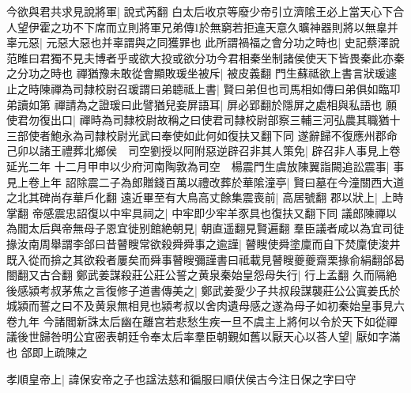 今欲與君共求見說將軍|{
	說式芮翻}
白太后收京等廢少帝引立濟隂王必上當天心下合人望伊霍之功不下席而立則將軍兄弟傳於無窮若拒違天意久曠神器則將以無辠并辜元惡|{
	元惡大惡也并辜謂與之同獲罪也}
此所謂禍福之會分功之時也|{
	史記蔡澤說范睢曰君獨不見夫博者乎或欲大投或欲分功今君相秦坐制諸侯使天下皆畏秦此亦秦之分功之時也}
禪猶豫未敢從會顯敗瑗坐被斥|{
	被皮義翻}
門生蘇祗欲上書言狀瑗遽止之時陳禪為司隸校尉召瑗謂曰弟聼祗上書|{
	賢曰弟但也司馬相如傳曰弟俱如臨卭弟讀如第}
禪請為之證瑗曰此譬猶兒妾屏語耳|{
	屏必郢翻於隱屏之處相與私語也}
願使君勿復出口|{
	禪時為司隸校尉故稱之曰使君司隸校尉部察三輔三河弘農其職猶十三部使者鮑永為司隸校尉光武曰奉使如此何如復扶又翻下同}
遂辭歸不復應州郡命　己卯以諸王禮葬北鄉侯　司空劉授以阿附惡逆辟召非其人策免|{
	辟召非人事見上卷延光二年}
十二月甲申以少府河南陶敦為司空　楊震門生虞放陳翼詣闕追訟震事|{
	事見上卷上年}
詔除震二子為郎贈錢百萬以禮改葬於華隂潼亭|{
	賢曰墓在今潼關西大道之北其碑尚存華戶化翻}
遠近畢至有大鳥高丈餘集震喪前|{
	高居號翻}
郡以狀上|{
	上時掌翻}
帝感震忠詔復以中牢具祠之|{
	中牢即少牢羊豕具也復扶又翻下同}
議郎陳禪以為閻太后與帝無母子恩宜徙别館絶朝見|{
	朝直遥翻見賢遍翻}
羣臣議者咸以為宜司徒掾汝南周舉謂李郃曰昔瞽瞍常欲殺舜舜事之逾謹|{
	瞽瞍使舜塗廩而自下焚廩使浚井既入從而揜之其欲殺者屢矣而舜事瞽瞍彌謹書曰祗載見瞽瞍夔夔齋栗掾俞絹翻郃曷閤翻又古合翻}
鄭武姜謀殺莊公莊公誓之黄泉秦始皇怨母失行|{
	行上孟翻}
久而隔絶後感潁考叔茅焦之言復修子道書傳美之|{
	鄭武姜愛少子共叔段謀襲莊公公寘姜氏於城潁而誓之曰不及黄泉無相見也潁考叔以舍肉遺母感之遂為母子如初秦始皇事見六卷九年}
今諸閻新誅太后幽在離宫若悲愁生疾一旦不虞主上將何以令於天下如從禪議後世歸咎明公宜密表朝廷令奉太后率羣臣朝覲如舊以厭天心以荅人望|{
	厭如字滿也}
郃即上疏陳之

孝順皇帝上|{
	諱保安帝之子也諡法慈和徧服曰順伏侯古今注日保之字曰守}


